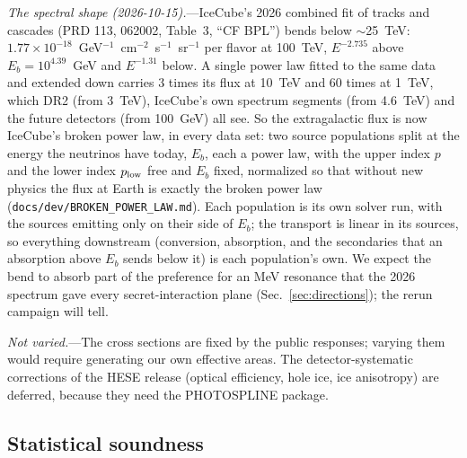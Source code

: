 \documentclass[11pt,a4paper]{article}
\newcommand{\file}[1]{\nolinkurl{#1}}
\begin{document}
\textit{The spectral shape (2026-10-15).}---IceCube's 2026 combined fit of tracks and cascades (PRD 113, 062002,
Table~3, ``CF BPL'') bends below $\sim$25~TeV: $1.77\times10^{-18}$~GeV$^{-1}$~cm$^{-2}$~s$^{-1}$~sr$^{-1}$ per flavor at
100~TeV, $E^{-2.735}$ above $E_b = 10^{4.39}$~GeV and $E^{-1.31}$ below. A single power law fitted to the same data and
extended down carries 3 times its flux at 10~TeV and 60 times at 1~TeV, which DR2 (from 3~TeV), IceCube's own
spectrum segments (from 4.6~TeV) and the future detectors (from 100~GeV) all see. So the extragalactic flux is now
IceCube's broken power law, in every data set: two source populations split at the energy the neutrinos have today,
$E_b$, each a power law, with the upper index $p$ and the lower index $p_{\rm low}$ free and $E_b$ fixed, normalized
so that without new physics the flux at Earth is exactly the broken power law (\file{docs/dev/BROKEN\_POWER\_LAW.md}).
Each population is its own solver run, with the sources emitting only on their side of $E_b$; the transport is linear
in its sources, so everything downstream (conversion, absorption, and the secondaries that an absorption above $E_b$
sends below it) is each population's own. We expect the bend to absorb part of the preference for an MeV resonance
that the 2026 spectrum gave every secret-interaction plane (Sec.~\ref{sec:directions}); the rerun campaign will tell.

\textit{Not varied.}---The cross sections are fixed by the public responses; varying them
would require generating our own effective areas. The detector-systematic corrections of the
HESE release (optical efficiency, hole ice, ice anisotropy) are deferred, because they need the
PHOTOSPLINE package.

\subsection{Statistical soundness}
\label{sec:soundness}
\end{document}
